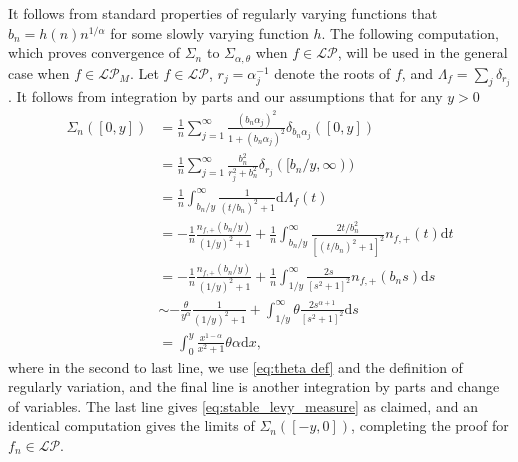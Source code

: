 \documentclass[reqno]{amsart}
\newcommand{\1}{\mathbf{1}}
\newcommand{\dd}{\mathrm{d}}
\newcommand{\LP}{\mathcal{LP}}
\theoremstyle{plain}
\theoremstyle{definition}
\theoremstyle{remark}
\numberwithin{equation}{section}
\begin{document}
	 It follows from standard properties of regularly varying functions \cite[Proposition 0.8 (v)]{Resnick2007} that $b_n=h(n)n^{1/\alpha}$ for some slowly varying function $h$. The following computation, which proves convergence of $\Sigma_{n}$ to $\Sigma_{\alpha,\theta}$ when $f\in\LP$, will be used in the general case when $f\in\LP_{M}$. Let $f\in\LP$, $r_j=\alpha_{j}^{-1}$ denote the roots of $f$, and $\Lambda_f=\sum_{j}\delta_{r_j}$. It follows from integration by parts and our assumptions that for any $y>0$ \begin{equation}\label{eq:stable measure conv real case}
	 	\begin{aligned}
	 		\Sigma_n([0,y])&=\frac{1}{n}\sum_{j=1}^{\infty}\frac{(b_n\alpha_{j})^2}{1+(b_n\alpha_{j})^2}\delta_{b_n\alpha_{j}}([0,y])\\
	 		&=\frac{1}{n}\sum_{j=1}^{\infty}\frac{b_n^2}{r_j^2+b_n^2}\delta_{r_j}([b_n/y,\infty))\\
	 		&=\frac{1}{n}\int_{b_n/y}^{\infty}\frac{1}{(t/b_n)^2+1 }\dd\Lambda_f(t)\\
	 		&=-\frac{1}{n}\frac{n_{f,+}(b_n/y)}{(1/y)^2+1}+\frac{1}{n}\int_{b_n/y}^{\infty}\frac{2t/b_n^2}{[(t/b_n)^2+1 ]^2}n_{f,+}(t)\dd t\\
	 		&=-\frac{1}{n}\frac{n_{f,+}(b_n/y)}{(1/y)^2+1}+\frac{1}{n}\int_{1/y}^{\infty}\frac{2s}{[s^2+1 ]^2}n_{f,+}(b_ns)\dd s\\
	 		&\sim -\frac{\theta}{y^\alpha}\frac{1}{(1/y)^2+1}+\int_{1/y}^{\infty}\theta\frac{2s^{\alpha+1}}{[s^2+1]^2}\dd s\\
	 		&=\int_{0}^{y}\frac{x^{1-\alpha }}{x^2+1}\theta\alpha \dd x,
	 	\end{aligned}
	 \end{equation} where in the second to last line, we use \eqref{eq:theta def} and the definition of regularly variation, and the final line is another integration by parts and change of variables.  The last line gives \eqref{eq:stable_levy_measure} as claimed, and an identical computation gives the limits of $\Sigma_{n}([-y,0])$, completing the proof for $f_n\in\LP$. 
	 
\end{document}
